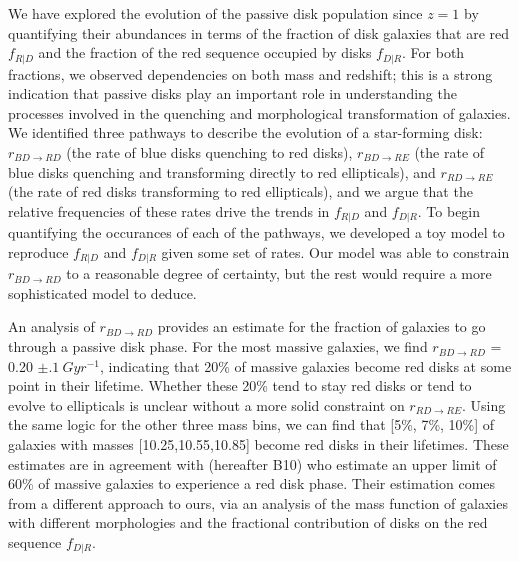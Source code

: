 We have explored the evolution of the passive disk population since $z=1$ by quantifying their abundances in terms of the fraction of disk galaxies that are red $f_{R|D}$ and the fraction of the red sequence occupied by disks $f_{D|R}$. For both fractions, we observed dependencies on both mass and redshift; this is a strong indication that passive disks play an important role in understanding the processes involved in the quenching and morphological transformation of galaxies. We identified three pathways to describe the evolution of a star-forming disk: $r_{BD \rightarrow RD}$ (the rate of blue disks quenching to red disks), $r_{BD \rightarrow RE}$ (the rate of blue disks quenching and transforming directly to red ellipticals), and $r_{RD \rightarrow RE}$ (the rate of red disks transforming to red ellipticals), and we argue that the relative frequencies of these rates drive the trends in $f_{R|D}$ and $f_{D|R}$. To begin quantifying the occurances of each of the pathways, we developed a toy model to reproduce $f_{R|D}$ and $f_{D|R}$ given some set of rates. Our model was able to constrain $r_{BD \rightarrow RD}$ to a reasonable degree of certainty, but the rest would require a more sophisticated model to deduce.

An analysis of $r_{BD \rightarrow RD}$ provides an estimate for the fraction of galaxies to go through a passive disk phase. For the most massive galaxies, we find $r_{BD \rightarrow RD}$ = 0.20 $\pm .1~Gyr^{-1}$, indicating that 20\% of massive galaxies become red disks at some point in their lifetime. Whether these 20\% tend to stay red disks or tend to evolve to ellipticals is unclear without a more solid constraint on $r_{RD \rightarrow RE}$. Using the same logic for the other three mass bins, we can find that [5\%, 7\%, 10\%] of galaxies with masses [10.25,10.55,10.85] become red disks in their lifetimes. These estimates are in agreement with \citet{Bundy2010} (hereafter B10) who estimate an upper limit of 60\% of massive galaxies to experience a red disk phase. Their estimation comes from a different approach to ours, via an analysis of the mass function of galaxies with different morphologies and the fractional contribution of disks on the red sequence $f_{D|R}$.  

